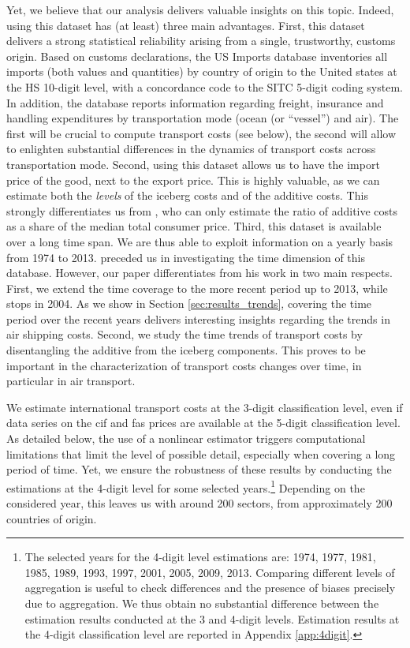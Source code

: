\documentclass[a4paper,11pt]{article}
\begin{document}
Yet, we believe that our analysis delivers valuable insights on this topic. Indeed, using this dataset has (at least) three main advantages. First, this dataset delivers a strong statistical reliability arising from a single, trustworthy, customs origin. Based on customs declarations, the US Imports database inventories all imports (both values and quantities) by country of origin to the United states at the HS 10-digit level, with a concordance code to the SITC 5-digit coding system. In addition, the database reports information regarding freight, insurance and handling expenditures by transportation mode (ocean (or ``vessel'') and air). The first will be crucial to compute transport costs (see below), the second will allow to enlighten substantial differences in the dynamics of transport costs across transportation mode. Second, using this dataset allows us to have the import price of the good, next to the export price. This is highly valuable, as we can estimate both the \textit{levels} of the iceberg costs and of the additive costs. This strongly differentiates us from \citet{Irrazabal_2015}, who can only estimate the ratio of additive costs as a share of the median total consumer price. Third, this dataset is available over a long time span. We are thus able to exploit information on a yearly basis from 1974 to 2013. \cite{hummels2007} preceded us in investigating the time dimension of this database. However, our paper differentiates from his work in two main respects. First, we extend the time coverage to the more recent period up to 2013, while \cite{hummels2007} stops in 2004. As we show in Section \ref{sec:results_trends}, covering the time period over the recent years delivers interesting insights regarding the trends in air shipping costs. Second, we study the time trends of transport costs by disentangling the additive from the iceberg components. This proves to be important in the characterization of transport costs changes over time, in particular in air transport.\smallskip

We estimate international transport costs at the 3-digit classification level, even if data series on the cif and fas prices are available at the 5-digit classification level. As detailed below, the use of a nonlinear estimator triggers computational limitations that limit the level of possible detail, especially when covering a long period of time. Yet, we ensure the robustness of these results by conducting the estimations at the 4-digit level for some selected years.\footnote{The selected years for the 4-digit level estimations are: 1974, 1977, 1981, 1985, 1989, 1993, 1997, 2001, 2005, 2009, 2013. Comparing different levels of aggregation is useful to check differences and the presence of biases precisely due to aggregation. We thus obtain no substantial difference between the estimation results conducted at the 3 and 4-digit levels. Estimation results at the 4-digit classification level are reported in Appendix \ref{app:4digit}.} Depending on the considered year, this leaves us with around 200 sectors, from approximately 200 countries of origin.
\end{document}
